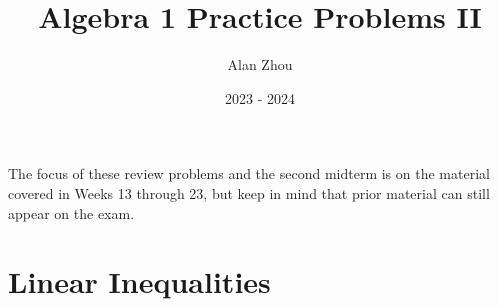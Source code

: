 \documentclass{article}
\title{Algebra 1 Practice Problems II}
\author{Alan Zhou}
\date{2023 - 2024}
\begin{document}
\maketitle

The focus of these review problems and the second midterm is on the material covered in Weeks 13 through 23, but keep in mind that prior material can still appear on the exam.

\tableofcontents





\section{Linear Inequalities}





\end{document}
